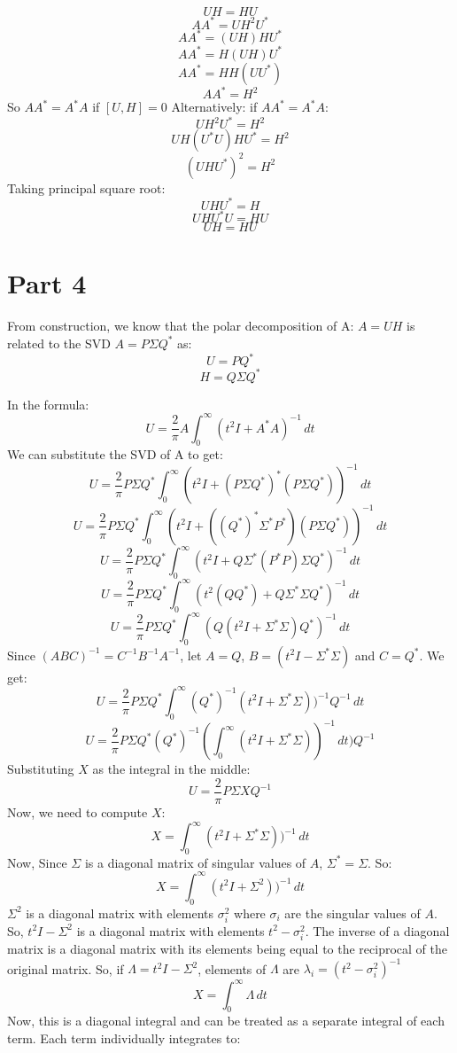 \documentclass{article}
\begin{document}
\[UH = HU\]
\[A A^* = U H^2 U^*\]
\[A A^* = (U H) H U^*\]
\[A A^* = H (U H) U^*\]
\[A A^* = H H (U U^*)\]
\[A A^* = H^2\]
So $A A^* = A^* A$ if $[U, H] = 0$
Alternatively: if $A A^* = A^* A$:
\[U H^2 U^* = H^2\]
\[U H (U^* U) H U^* = H^2\]
\[(U H U^*)^2 = H^2\]
Taking principal square root:
\[U H U^* = H\]
\[U H U^* U = H U\]
\[U H = H U\]

\newpage
\section{Part 4}

From construction, we know that the polar decomposition of A: $A = U H$ is related to the SVD $A = P\Sigma Q^*$ as:
\[U = PQ^*\]
\[H = Q \Sigma Q^*\]

In the formula: 
\[ U = \frac{2}{\pi} A \int_{0}^{\infty} (t^2 I + A^* A)^{-1} \,dt\]
We can substitute the SVD of A to get:
\[ U = \frac{2}{\pi} P \Sigma Q^* \int_{0}^{\infty} (t^2 I + (P \Sigma Q^*)^* (P \Sigma Q^*))^{-1} \,dt\]
\[ U = \frac{2}{\pi} P \Sigma Q^* \int_{0}^{\infty} (t^2 I + ((Q^*)^* \Sigma^* P^*) (P \Sigma Q^*))^{-1} \,dt\]
\[ U = \frac{2}{\pi} P \Sigma Q^* \int_{0}^{\infty} (t^2 I + Q \Sigma^* (P^* P) \Sigma Q^*)^{-1} \,dt\]
\[ U = \frac{2}{\pi} P \Sigma Q^* \int_{0}^{\infty} (t^2 (Q Q^*) + Q \Sigma^* \Sigma Q^*)^{-1} \,dt\]
\[ U = \frac{2}{\pi} P \Sigma Q^* \int_{0}^{\infty} (Q(t^2 I + \Sigma^* \Sigma)Q^*)^{-1} \,dt\]
Since $(ABC)^{-1} = C^{-1} B^{-1} A^{-1}$, let $A = Q$, $B = (t^2 I - \Sigma^* \Sigma)$ and $C = Q^*$. We get:
\[ U = \frac{2}{\pi} P \Sigma Q^* \int_{0}^{\infty} (Q^*)^{-1} (t^2 I + \Sigma^* \Sigma))^{-1} Q^{-1} \,dt\]
\[ U = \frac{2}{\pi} P \Sigma Q^* (Q^*)^{-1} (\int_{0}^{\infty} (t^2 I + \Sigma^* \Sigma))^{-1}  \,dt) Q^{-1}\]
Substituting $X$ as the integral in the middle:
\[ U = \frac{2}{\pi} P \Sigma X Q^{-1}\]
Now, we need to compute $X$:
\[ X = \int_{0}^{\infty} (t^2 I + \Sigma^* \Sigma))^{-1}  \,dt\]
Now, Since $\Sigma$ is a diagonal matrix of singular values of $A$, $\Sigma^* = \Sigma$. So:
\[ X = \int_{0}^{\infty} (t^2 I + \Sigma^2))^{-1}  \,dt\]
$\Sigma^2$ is a diagonal matrix with elements $\sigma_{i}^2$ where $\sigma_{i}$ are the singular values of $A$.
So, $t^2 I - \Sigma^2$ is a diagonal matrix with elements $t^2-\sigma_{i}^2$. The inverse of a diagonal matrix is a diagonal matrix with its elements being equal to the reciprocal of the original matrix. So, if $\Lambda = t^2 I - \Sigma^2$, elements of $\Lambda$ are $\lambda_{i} = (t^2 - \sigma_{i}^2)^{-1}$
\[ X = \int_{0}^{\infty} \Lambda \,dt\]
Now, this is a diagonal integral and can be treated as a separate integral of each term. Each term individually integrates to:
\end{document}
